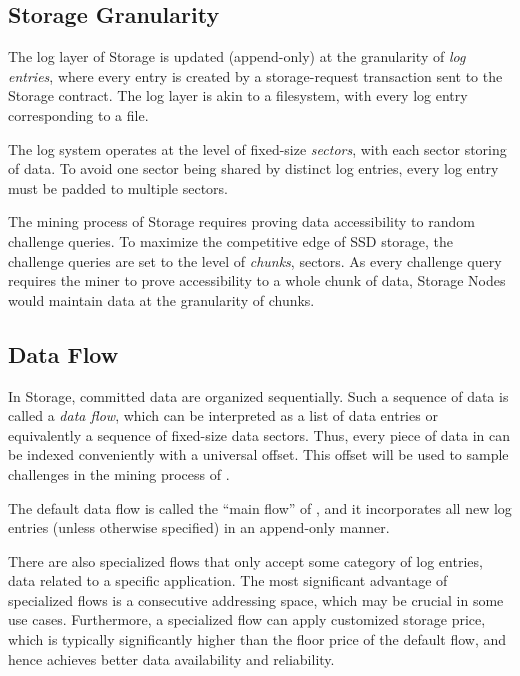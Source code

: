 \subsection{Storage Granularity}

The log layer of \projabbrev Storage is updated (append-only) at the granularity of \emph{log entries}, 
where every entry is created by a storage-request transaction sent to the \projabbrev Storage contract.
The log layer is akin to a filesystem, with every log entry corresponding to a file.

The log system operates at the level of fixed-size \emph{sectors}, with each sector storing \sectorsize of data. 
To avoid one sector being shared by distinct log entries,
every log entry must be padded to multiple sectors.

The mining process of \projabbrev Storage requires proving data accessibility to random challenge queries.
To maximize the competitive edge of SSD storage, the challenge queries are set to the level of \chunksize \emph{chunks},  sectors.
As every challenge query requires the miner to prove accessibility to a whole chunk of data, Storage Nodes would maintain data at the granularity of chunks. 

\subsection{Data Flow}
In \projabbrev Storage, committed data are organized sequentially.
Such a sequence of data is called a \emph{data flow}, which can be interpreted as a list of data entries or equivalently a sequence of fixed-size data sectors.
Thus, every piece of data in \project can be indexed conveniently with a universal offset.
This offset will be used to sample challenges in the mining process of \sproof.


The default data flow is called the ``main flow'' of \project, and it incorporates all new log entries (unless otherwise specified) in an append-only manner.

There are also specialized flows that only accept some category of log entries,
\eg data related to a specific application.
The most significant advantage of specialized flows is a consecutive addressing space, which may be crucial in some use cases. 
Furthermore, a specialized flow can apply customized storage price, which is typically significantly higher than the floor price of the default flow, and hence achieves better data availability and reliability.